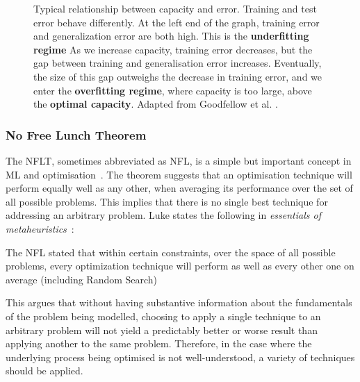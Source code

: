 \begin{figure}[htp]
    \centering
    
    \captionsetup{format=hang} %
    \caption{
        Typical relationship between capacity and error. Training and test error
        behave differently. At the left end of the graph, training error and
        generalization error are both high. This is the \textbf{underfitting
        regime} As we increase capacity, training error decreases, but the gap
        between training and generalisation error increases. Eventually, the
        size of this gap outweighs the decrease in training error, and we enter
        the \textbf{overfitting regime}, where capacity is too large, above the
        \textbf{optimal capacity}. Adapted from Goodfellow et al.
        \cite{Goodfellow-et-al-2016}.
    }
    \label{fig:capacity}
\end{figure}

\subsubsection{No Free Lunch Theorem}

The \gls{NFLT}, sometimes abbreviated as \gls{NFL}, is a simple but important
concept in \gls{ML} and optimisation~\cite{Wolpert1997}. The theorem suggests
that an optimisation technique will perform equally well as any other, when
averaging its performance over the set of all possible problems. This implies
that there is no single best technique for addressing an arbitrary problem. Luke
states the following in \textit{essentials of
metaheuristics}~\cite{luke2012essentials}:

\begin{fancyquotes}
    The \gls{NFL} stated that within certain constraints, over the space of
    all possible problems, every optimization technique will perform as well as
    every other one on average (including Random Search)
\end{fancyquotes}

This argues that without having substantive information about the fundamentals
of the problem being modelled, choosing to apply a single technique to an
arbitrary problem will not yield a predictably better or worse result than
applying another to the same problem. Therefore, in the case where the
underlying process being optimised is not well-understood, a variety of
techniques should be applied.

